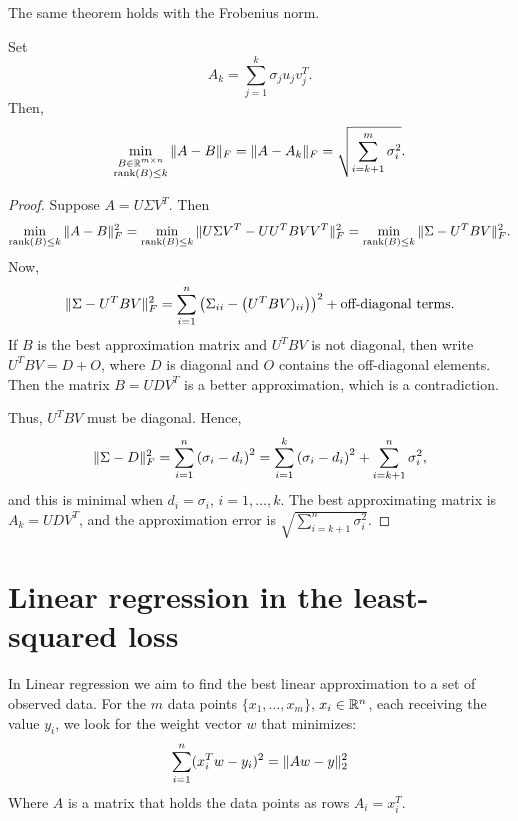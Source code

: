 \documentclass{article}
\begin{document}
The same theorem holds with the Frobenius norm.
\begin{theorem} Set
\begin{equation*}
A_{k} = \sum_{j=1}^{k} \sigma_{j} u_{j} v_{j}^{T}.
\end{equation*}
Then,
\begin{equation*}
\min_{\substack{B \in \mathbb{R}^{m \times n} \\
\operatorname{rank}(B) \leq k}} \| A-B \|_{F} = \| A-A_{k} \|_{F}
= \sqrt{\sum_{i=k+1}^{m} \sigma_{i}^{2}}.
\end{equation*}
\end{theorem}
\begin{proof}
Suppose $A=U \Sigma V^{T}$. Then
\begin{equation*}
\min_{\operatorname{rank}(B) \leq k} \| A-B \|^{2}_{F} =
\min_{\operatorname{rank}(B) \leq k} \| U \Sigma V^{T} - UU^{T} B
VV^{T} \|^{2}_{F} = \min_{\operatorname{rank}(B) \leq k} \| \Sigma
- U^{T} B V \|^{2}_{F}.
\end{equation*}
Now,
\begin{equation*}
\| \Sigma - U^{T} B V \|^{2}_{F} = \sum_{i=1}^{n} \left (
\Sigma_{ii} - \left (U^{T}B V)_{ii} \right ) \right )^{2} +
\text{off-diagonal terms}.
\end{equation*}
If $B$ is the best approximation matrix and $U^{T}B V$ is not
diagonal, then write $U^{T}B V=D+O$, where $D$ is diagonal and $O$
contains the off-diagonal elements. Then the matrix $B = U D V^{T}$
is a better approximation, which is a contradiction.

Thus, $U^{T}B V$ must be diagonal. Hence,
\begin{equation*}
\| \Sigma - D \|^{2}_{F} = \sum_{i=1}^{n} \left (\sigma_{i} - d_{i}
\right )^{2} = \sum_{i=1}^{k} \left (\sigma_{i} - d_{i} \right )^{2}
+ \sum_{i=k+1}^{n} \sigma_{i}^{2},
\end{equation*}
and this is minimal when $d_{i}=\sigma_{i}$, $i=1,\ldots,k$. The
best approximating matrix is $A_{k} = U D V^{T}$, and the
approximation error is $\sqrt{\sum_{i=k+1}^{n} \sigma_{i}^{2}}$.
\end{proof}


\section{Linear regression in the least-squared loss}
In Linear regression we aim to find the best linear approximation 
to a set of observed data. For the $m$ data  points $\{x_1,\ldots,x_m\}$,  $x_i \in {\mathbb{R}}^n$,
each receiving the value $y_i$, we look for the weight vector $w$ that minimizes:
\[
\sum_{i=1}^{n} (x_{i}^{T}w - y_i)^2 = \| Aw - y \|_{2}^{2}
\]
Where $A$ is a matrix that holds the data points as rows $A_i = x^{T}_{i}$.
\end{document}
